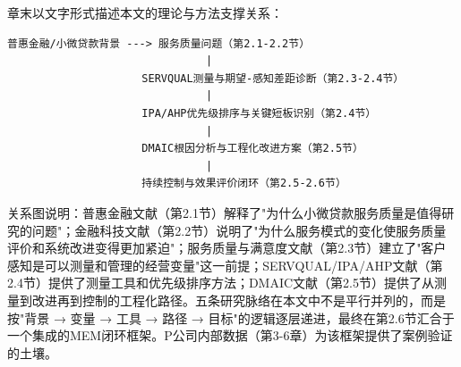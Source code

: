 章末以文字形式描述本文的理论与方法支撑关系：

\begin{verbatim}
普惠金融/小微贷款背景 ---> 服务质量问题（第2.1-2.2节）
                               |
                     SERVQUAL测量与期望-感知差距诊断（第2.3-2.4节）
                               |
                     IPA/AHP优先级排序与关键短板识别（第2.4节）
                               |
                     DMAIC根因分析与工程化改进方案（第2.5节）
                               |
                     持续控制与效果评价闭环（第2.5-2.6节）
\end{verbatim}

关系图说明：普惠金融文献（第2.1节）解释了"为什么小微贷款服务质量是值得研究的问题"；金融科技文献（第2.2节）说明了"为什么服务模式的变化使服务质量评价和系统改进变得更加紧迫"；服务质量与满意度文献（第2.3节）建立了"客户感知是可以测量和管理的经营变量"这一前提；SERVQUAL/IPA/AHP文献（第2.4节）提供了测量工具和优先级排序方法；DMAIC文献（第2.5节）提供了从测量到改进再到控制的工程化路径。五条研究脉络在本文中不是平行并列的，而是按"背景 → 变量 → 工具 → 路径 → 目标"的逻辑逐层递进，最终在第2.6节汇合于一个集成的MEM闭环框架。P公司内部数据（第3-6章）为该框架提供了案例验证的土壤。\par

